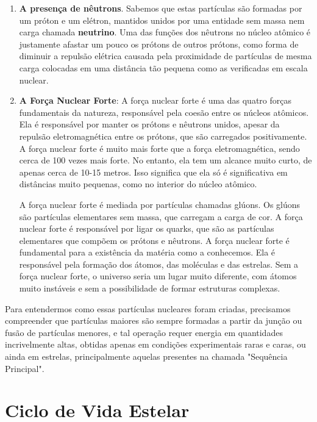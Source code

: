 \documentclass[a4paper,12pt]{book}
\begin{document}
\begin{enumerate}
	\item \textbf{A presença de nêutrons}. Sabemos que estas partículas são formadas por um próton e um elétron, mantidos unidos por uma entidade sem massa nem carga chamada \textbf{neutrino}. Uma das funções dos nêutrons no núcleo atômico é justamente afastar um pouco os prótons de outros prótons, como forma de diminuir a repulsão elétrica causada pela proximidade de partículas de mesma carga colocadas em uma distância tão pequena como as verificadas em escala nuclear.
	\item \textbf{A Força Nuclear Forte}: A força nuclear forte é uma das quatro forças fundamentais da natureza, responsável pela coesão entre os núcleos atômicos. Ela é responsável por manter os prótons e nêutrons unidos, apesar da repulsão eletromagnética entre os prótons, que são carregados positivamente. A força nuclear forte é muito mais forte que a força eletromagnética, sendo cerca de 100 vezes mais forte. No entanto, ela tem um alcance muito curto, de apenas cerca de 10-15 metros. Isso significa que ela só é significativa em distâncias muito pequenas, como no interior do núcleo atômico.
	
	A força nuclear forte é mediada por partículas chamadas glúons. Os glúons são partículas elementares sem massa, que carregam a carga de cor. A força nuclear forte é responsável por ligar os quarks, que são as partículas elementares que compõem os prótons e nêutrons. A força nuclear forte é fundamental para a existência da matéria como a conhecemos. Ela é responsável pela formação dos átomos, das moléculas e das estrelas. Sem a força nuclear forte, o universo seria um lugar muito diferente, com átomos muito instáveis e sem a possibilidade de formar estruturas complexas.
\end{enumerate}

Para entendermos como essas partículas nucleares foram criadas, precisamos compreender que partículas maiores são sempre formadas a partir da junção ou fusão de partículas menores, e tal operação requer energia em quantidades incrivelmente altas, obtidas apenas em condições experimentais raras e caras, ou ainda em estrelas, principalmente aquelas presentes na chamada "Sequência Principal".

\section{Ciclo de Vida Estelar}
\end{document}
